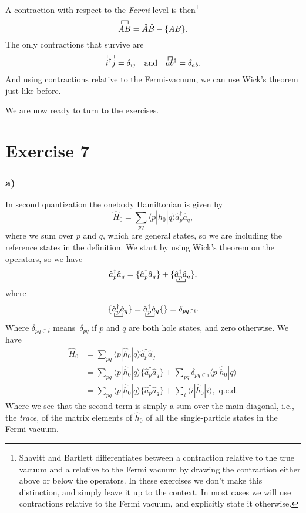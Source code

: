 \documentclass[a4paper, 11pt, notitlepage, english]{article}
\newcommand{\op}[1]{\hat{#1}}
\newcommand{\braopket}[3]{\langle #1 | {#2} | #3 \rangle}
\begin{document}
A contraction with respect to the \emph{Fermi}-level is then\footnote{Shavitt and Bartlett differentiates between a contraction relative to the true vacuum and a relative to the Fermi vacuum by drawing the contraction either above or below the operators. In these exercises we don't make this distinction, and simply leave it up to the context. In most cases we will use contractions relative to the Fermi vacuum, and explicitly state it otherwise.}
$$\contraction{}{A}{}{B}AB = \op{A}\op{B} - \{AB\}.$$
The only contractions that survive are
$$\contraction{}{i}{^\dag}{j}i^\dag j = \delta_{ij} \quad \mbox{and} \quad \contraction{}{a}{}{b}ab^\dag = \delta_{ab}.$$
And using contractions relative to the Fermi-vacuum, we can use Wick's theorem just like before. 

We are now ready to turn to the exercises.

\clearpage

\section*{Exercise 7}

\subsubsection*{a)}
In second quantization the onebody Hamiltonian is given by
$$\op{H}_0 = \sum_{pq}\braopket{p}{\op{h}_0}{q}\op{a}_p^\dag \op{a}_q,$$
where we sum over $p$ and $q$, which are general states, so we are including the reference states in the definition. We start by using Wick's theorem on the operators, so we have
$$\op{a}_p^\dag \op{a}_q = \{\op{a}_p^\dag \op{a}_q\} + \{\bcontraction{}{a}{_p^\dag}{a}\op{a}_p^\dag \op{a}_q\},$$
where
$$\{\bcontraction{}{a}{_p^\dag}{a}\op{a}_p^\dag \op{a}_q\} = \bcontraction{}{a}{_p^\dag}{a}\op{a}_p^\dag \op{a}_q\{\} = \delta_{pq\in i}.$$
Where $\delta_{pq\in i}$ means $\delta_{pq}$ if $p$ and $q$ are both hole states, and zero otherwise. We have
\begin{align*}
\op{H}_0 &= \sum_{pq}\braopket{p}{\op{h}_0}{q}\op{a}_p^\dag \op{a}_q \\
&= \sum_{pq}\braopket{p}{\op{h}_0}{q}\{\op{a}_p^\dag \op{a}_q\} + \sum_{pq}\delta_{pq\in i}\braopket{p}{\op{h}_0}{q} \\
&= \sum_{pq}\braopket{p}{\op{h}_0}{q}\{\op{a}_p^\dag \op{a}_q\} + \sum_{i}\braopket{i}{\op{h}_0}{i}, \mbox{ q.e.d.}
\end{align*}
Where we see that the second term is simply a sum over the main-diagonal, i.e., the \emph{trace}, of the matrix elements of $\op{h}_0$ of all the single-particle states in the Fermi-vacuum.
\end{document}
